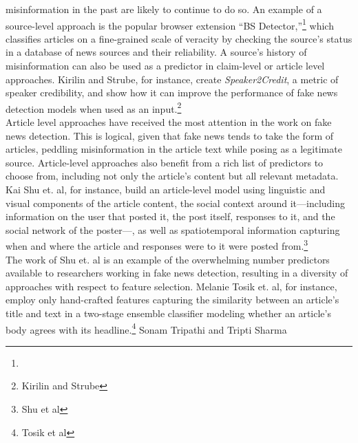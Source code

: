 \documentclass[12pt]{article}
\begin{document}
misinformation in the past are likely to continue to do so. An example
of a source-level approach is the popular browser extension ``BS
Detector,''\footnote{} which classifies articles on a fine-grained scale
of veracity by checking the source's status in a database of news
sources and their reliability. A source's history of misinformation can
also be used as a predictor in claim-level or article level approaches.
Kirilin and Strube, for instance, create \emph{Speaker2Credit}, a metric
of speaker credibility, and show how it can improve the performance of
fake news detection models when used as an input.\footnote{Kirilin and
  Strube}\\
\hspace*{0.333em}\hspace*{0.333em}\hspace*{0.333em}\hspace*{0.333em}\hspace*{0.333em}Article
level approaches have received the most attention in the work on fake
news detection. This is logical, given that fake news tends to take the
form of articles, peddling misinformation in the article text while
posing as a legitimate source. Article-level approaches also benefit
from a rich list of predictors to choose from, including not only the
article's content but all relevant metadata. Kai Shu et. al, for
instance, build an article-level model using linguistic and visual
components of the article content, the social context around
it---including information on the user that posted it, the post itself,
responses to it, and the social network of the poster---, as well as
spatiotemporal information capturing when and where the article and
responses were to it were posted from.\footnote{Shu et al}\\
\hspace*{0.333em}\hspace*{0.333em}\hspace*{0.333em}\hspace*{0.333em}\hspace*{0.333em}The
work of Shu et. al is an example of the overwhelming number predictors
available to researchers working in fake news detection, resulting in a
diversity of approaches with respect to feature selection. Melanie Tosik
et. al, for instance, employ only hand-crafted features capturing the
similarity between an article's title and text in a two-stage ensemble
classifier modeling whether an article's body agrees with its
headline.\footnote{Tosik et al} Sonam Tripathi and Tripti Sharma
\end{document}
